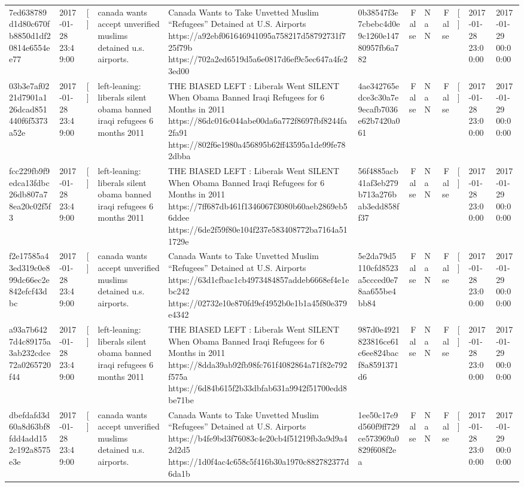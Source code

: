 \begin{tabular}{llllllrlrlll}
7ed638789d1d80c670fb8850d1df20814e6554ee77 & 2017-01-28 23:49:00 & [] & canada wants accept unverified muslims detained u.s. airports. & Canada Wants to Take Unvetted Muslim “Refugees” Detained at U.S. Airports https://a92ebf061646941095a758217d58792731f725f79b https://702a2ed6519d5a6e0817d6ef9c5ec647a4fe23ed00 & 0b38547f3e7cbebc4d0e9c1260e14780957fb6a782 & False & NaN & False & [] & 2017-01-28 23:00:00 & 2017-01-29 00:00:00 \\
03b3e7af0221d7901a126dcad851440f6f5373a52e & 2017-01-28 23:49:00 & [] & left-leaning: liberals silent obama banned iraqi refugees 6 months 2011 & THE BIASED LEFT : Liberals Went SILENT When Obama Banned Iraqi Refugees for 6 Months in 2011 https://86dc016c044abe00da6a772f8697fbf8244fa2fa91 https://802f6e1980a456895b62ff43595a1de99fe782dbba & 4ae342765edce3c30a7e9ecafb7036e62b7420a061 & False & NaN & False & [] & 2017-01-28 23:00:00 & 2017-01-29 00:00:00 \\
fcc229fb9f9edca13fdbc26db807a78ea20c02f5f3 & 2017-01-28 23:49:00 & [] & left-leaning: liberals silent obama banned iraqi refugees 6 months 2011 & THE BIASED LEFT : Liberals Went SILENT When Obama Banned Iraqi Refugees for 6 Months in 2011 https://7ff687db461f1346067f3080b60aeb2869eb56ddee https://6de2f59f80e104f237e583408772ba7164a511729e & 56f4885acb41af3eb279b713a276bab3edd858ff37 & False & NaN & False & [] & 2017-01-28 23:00:00 & 2017-01-29 00:00:00 \\
f2e17585a43ed319c0e899dc66ec2e842efcf43dbc & 2017-01-28 23:49:00 & [] & canada wants accept unverified muslims detained u.s. airports. & Canada Wants to Take Unvetted Muslim “Refugees” Detained at U.S. Airports https://63d1cfbac1cb4973484857addeb6668ef4e1ebc242 https://02732e10e870fd9ef4952b0e1b1a45f80e379e4342 & 5e2da79d5110cfd8523a5ccced0e78aa655be4bb84 & False & NaN & False & [] & 2017-01-28 23:00:00 & 2017-01-29 00:00:00 \\
a93a7b6427d4c89175a3ab232cdce72a0265720f44 & 2017-01-28 23:49:00 & [] & left-leaning: liberals silent obama banned iraqi refugees 6 months 2011 & THE BIASED LEFT : Liberals Went SILENT When Obama Banned Iraqi Refugees for 6 Months in 2011 https://8dda39ab92fb98fc761f4082864a71f82e792f575a https://6d84b615f2b33dbfab631a9942f51700edd8be71be & 987d0e4921823816ce61c6ee824bacf8a8591371d6 & False & NaN & False & [] & 2017-01-28 23:00:00 & 2017-01-29 00:00:00 \\
dbefdafd3d60a8d63bf8fdd4add152c192a8575e3e & 2017-01-28 23:49:00 & [] & canada wants accept unverified muslims detained u.s. airports. & Canada Wants to Take Unvetted Muslim “Refugees” Detained at U.S. Airports https://b4fe9bd3f76083c4e20cb4f51219fb3a9d9a42d2d5 https://1d0f4ac4c658c5f416b30a1970c882782377d6da1b & 1ee50c17e9d560f9ff729ce573969a0829f608f2ea & False & NaN & False & [] & 2017-01-28 23:00:00 & 2017-01-29 00:00:00 \\

\end{tabular}
